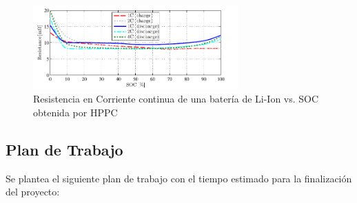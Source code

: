 \documentclass[10pt,a4paper]{article}
\begin{document}
 \begin{figure}[h!]
 	\begin{center}
 		\includegraphics[width=0.7\textwidth]{Ro_vs_SOC.png}
 		\caption{Resistencia en Corriente continua de una batería de Li-Ion vs. SOC obtenida por HPPC}
 		\label{Internal_resistance}
 	\end{center}
 \end{figure}
 
 
\clearpage
\subsection{Plan de Trabajo}

Se plantea el siguiente plan de trabajo con el tiempo estimado para la finalización del proyecto:
\end{document}
